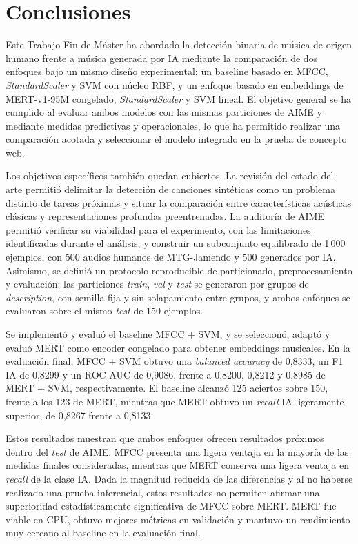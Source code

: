 \chapter{Conclusiones}\label{cap:conclusiones}

Este Trabajo Fin de Máster ha abordado la detección binaria de música de origen humano frente a música generada por IA mediante la comparación de dos enfoques bajo un mismo diseño experimental: un baseline basado en MFCC, \textit{StandardScaler} y SVM con núcleo RBF, y un enfoque basado en embeddings de MERT-v1-95M congelado, \textit{StandardScaler} y SVM lineal. El objetivo general se ha cumplido al evaluar ambos modelos con las mismas particiones de AIME y mediante medidas predictivas y operacionales, lo que ha permitido realizar una comparación acotada y seleccionar el modelo integrado en la prueba de concepto web.

Los objetivos específicos también quedan cubiertos. La revisión del estado del arte permitió delimitar la detección de canciones sintéticas como un problema distinto de tareas próximas y situar la comparación entre características acústicas clásicas y representaciones profundas preentrenadas. La auditoría de AIME permitió verificar su viabilidad para el experimento, con las limitaciones identificadas durante el análisis, y construir un subconjunto equilibrado de 1\,000 ejemplos, con 500 audios humanos de MTG-Jamendo y 500 generados por IA. Asimismo, se definió un protocolo reproducible de particionado, preprocesamiento y evaluación: las particiones \textit{train}, \textit{val} y \textit{test} se generaron por grupos de \textit{description}, con semilla fija y sin solapamiento entre grupos, y ambos enfoques se evaluaron sobre el mismo \textit{test} de 150 ejemplos.

Se implementó y evaluó el baseline MFCC + SVM, y se seleccionó, adaptó y evaluó MERT como encoder congelado para obtener embeddings musicales. En la evaluación final, MFCC + SVM obtuvo una \textit{balanced accuracy} de 0,8333, un F1 IA de 0,8299 y un ROC-AUC de 0,9086, frente a 0,8200, 0,8212 y 0,8985 de MERT + SVM, respectivamente. El baseline alcanzó 125 aciertos sobre 150, frente a los 123 de MERT, mientras que MERT obtuvo un \textit{recall} IA ligeramente superior, de 0,8267 frente a 0,8133.

Estos resultados muestran que ambos enfoques ofrecen resultados próximos dentro del \textit{test} de AIME. MFCC presenta una ligera ventaja en la mayoría de las medidas finales consideradas, mientras que MERT conserva una ligera ventaja en \textit{recall} de la clase IA. Dada la magnitud reducida de las diferencias y al no haberse realizado una prueba inferencial, estos resultados no permiten afirmar una superioridad estadísticamente significativa de MFCC sobre MERT. MERT fue viable en CPU, obtuvo mejores métricas en validación y mantuvo un rendimiento muy cercano al baseline en la evaluación final.

